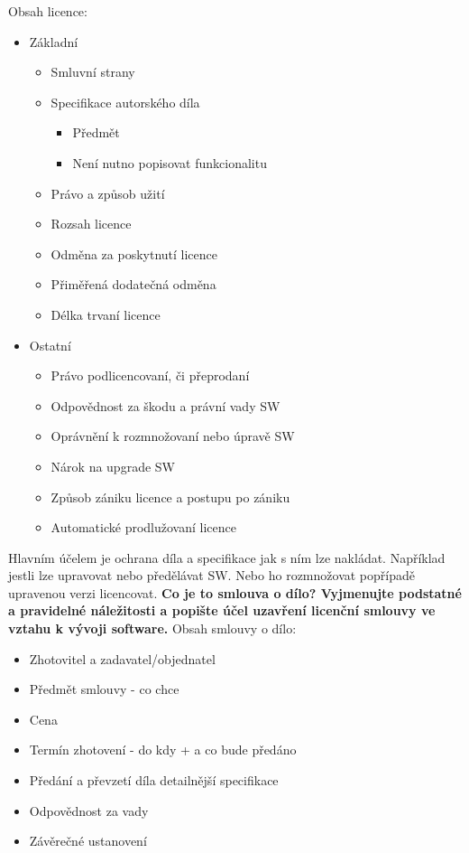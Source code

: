 \documentclass[12pt,a4paper,czech]{report}
\newcommand{\nadpis}[1]{\noindent\textbf{\Large{#1}}\normalsize}
\begin{document}
Obsah licence: 
\begin{itemize}
    \item Základní
    \begin{itemize}
        \item Smluvní strany
        \item Specifikace autorského díla
        \begin{itemize}
            \item Předmět
            \item Není nutno popisovat funkcionalitu
        \end{itemize}
        \item Právo a způsob užití
        \item Rozsah licence
        \item Odměna za poskytnutí licence
        \item Přiměřená dodatečná odměna
        \item Délka trvaní licence
    \end{itemize}
    \item Ostatní
    \begin{itemize}
        \item Právo podlicencovaní, či přeprodaní
        \item Odpovědnost za škodu a právní vady SW
        \item Oprávnění k rozmnožovaní nebo úpravě SW
        \item Nárok na upgrade SW
        \item Způsob zániku licence a postupu po zániku
        \item Automatické prodlužovaní licence
    \end{itemize}
\end{itemize}
  
Hlavním účelem je ochrana díla a specifikace jak s ním lze nakládat. Například jestli lze upravovat nebo předělávat SW. Nebo ho rozmnožovat popřípadě upravenou verzi licencovat. 
\newline
\newline
\nadpis{Co je to smlouva o dílo? Vyjmenujte podstatné a pravidelné náležitosti a popište účel uzavření licenční smlouvy ve vztahu k vývoji software.}
\newline
\newline
Obsah smlouvy o dílo:
\begin{itemize}
    \item Zhotovitel a zadavatel/objednatel
    \item Předmět smlouvy - co chce
    \item Cena
    \item Termín zhotovení - do kdy + a co bude předáno
    \item Předání a převzetí díla detailnější specifikace
    \item Odpovědnost za vady
    \item Závěrečné ustanovení
\end{itemize}
\end{document}
